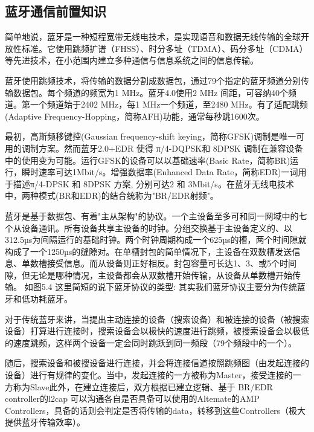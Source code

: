 \subsection{蓝牙通信前置知识}
简单地说，蓝牙是一种短程宽带无线电技术，是实现语音和数据无线传输的全球开放性标准。它使用跳频扩谱（FHSS）、时分多址（TDMA）、码分多址（CDMA）等先进技术，在小范围内建立多种通信与信息系统之间的信息传输。

蓝牙使用跳频技术，将传输的数据分割成数据包，通过79个指定的蓝牙频道分别传输数据包。每个频道的频宽为1 MHz。蓝牙4.0使用2 MHz 间距，可容纳40个频道。第一个频道始于2402 MHz，每1 MHz一个频道，至2480 MHz。有了适配跳频(Adaptive Frequency-Hopping，简称AFH)功能，通常每秒跳1600次。

最初，高斯频移键控(Gaussian frequency-shift keying，简称GFSK)调制是唯一可用的调制方案。然而蓝牙2.0+EDR 使得 π/4-DQPSK和 8DPSK 调制在兼容设备中的使用变为可能。运行GFSK的设备可以以基础速率(Basic Rate，简称BR)运行，瞬时速率可达1Mbit/s。增强数据率(Enhanced Data Rate，简称EDR)一词用于描述π/4-DPSK 和 8DPSK 方案, 分别可达2 和 3Mbit/s。在蓝牙无线电技术中，两种模式(BR和EDR)的结合统称为"BR/EDR射频"。

蓝牙是基于数据包、有着"主从架构"的协议。一个主设备至多可和同一网域中的七个从设备通讯。所有设备共享主设备的时钟。分组交换基于主设备定义的、以312.5µs为间隔运行的基础时钟。两个时钟周期构成一个625µs的槽，两个时间隙就构成了一个1250µs的缝隙对。在单槽封包的简单情况下，主设备在双数槽发送信息、单数槽接受信息。而从设备则正好相反。封包容量可长达1、3、或5个时间隙，但无论是哪种情况，主设备都会从双数槽开始传输，从设备从单数槽开始传输。
如图5.4
这里简短的说下蓝牙协议的类型: 
其实我们蓝牙协议主要分为传统蓝牙和低功耗蓝牙。

对于传统蓝牙来讲，当提出主动连接的设备（搜索设备）和被连接的设备（被搜索设备）打算进行连接时，搜索设备会以极快的速度进行跳频，被搜索设备会以极低的速度跳频，这样两个设备一定会同时跳跃到同一频段（79个频段中的一个）。

随后，搜索设备和被搜设备进行连接，并会将连接信道按照跳频图（由发起连接的设备）进行有规律的变化。当中，发起连接的一方被称为Master，接受连接的一方称为Slave此外，在建立连接后，双方根据已建立逻辑、基于 BR/EDR controller的l2cap 可以沟通各自是否具备可以使用的Altemate的AMP Controllers，具备的话则会判定是否将传输的data，转移到这些Controllers（极大提供蓝牙传输效率）。


